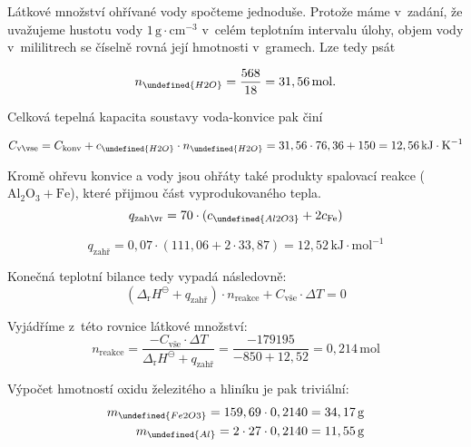 \documentclass{book}
\let\ch\undefined
\begin{document}
Látkové množství ohřívané vody spočteme jednoduše. Protože máme v~zadání, že uvažujeme hustotu vody $1\,\mathrm{g\cdot cm^{-3}}$ v~celém teplotním intervalu úlohy, objem vody v~mililitrech se číselně
rovná její hmotnosti v~gramech. Lze tedy psát

\[
n_{\ch{H2O}}=\frac{568}{18}=31,56\,\mathrm{mol}.
\]

Celková tepelná kapacita soustavy voda-konvice pak činí

\[
C_{\mathrm{vše}}=C_{\mathrm{konv}}+c_{\ch{H2O}}\cdot n_{\ch{H2O}}=31,56\cdot 76,36+150=12,56\,\mathrm{kJ\cdot K^{-1}}
\]

Kromě ohřevu konvice a vody jsou ohřáty také produkty spalovací
reakce ($\mathrm{Al_{2}O_{3}+Fe}$), které přijmou část vyprodukovaného tepla.
\[
q_{\mathrm{zahř}}=70\cdot (c_{\ch{Al2O3}}+2c_{\mathrm{Fe}})
\]

\[
q_{\mathrm{zahř}}=0,07\cdot (111,06+2\cdot33,87)=12,52\,\mathrm{kJ\cdot mol^{-1}}
\]

Konečná teplotní bilance tedy vypadá následovně:
\[
(\Delta_{\mathrm{r}}H^{\ominus}+q_{\mathrm{zahř}})\cdot n_{\mathrm{reakce}}+C_{\mathrm{vše}}\cdot \Delta T=0
\]

Vyjádříme z~této rovnice látkové množství:
\[
n_{\mathrm{reakce}}=\frac{-C_{\mathrm{vše}}\cdot \Delta T}{\Delta _{\mathrm{r}}H^{\ominus}+q_{\mathrm{zahř}}}=\frac{-179195}{-850+12,52}=0,214\, \mathrm{mol}
\]

Výpočet hmotností oxidu železitého a hliníku je pak triviální:
\begin{align*}
m_{\ch{Fe2O3}}=159,69\cdot0,2140=34,17\,\mathrm{g}\\
m_{\ch{Al}}=2\cdot27\cdot0,2140=11,55\,\mathrm{g}
\end{align*}
\end{document}
